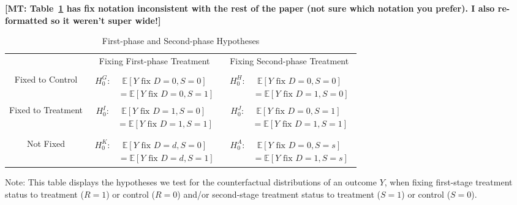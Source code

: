 \textbf{[MT: Table~\ref{table:hypotheses} has fix notation inconsistent with the rest of the paper (not sure which notation you prefer). I also re-formatted so it weren't super wide!]}

\begin{table}[H] 
\begin{threeparttable}
\caption{First-phase and Second-phase Hypotheses}
\label{table:hypotheses}
\centering 
\begin{tabular}{ccc} \toprule
 & Fixing First-phase Treatment & Fixing Second-phase Treatment \\ \\ \midrule
Fixed to Control       & $ \begin{aligned} H_{0}^G: & \enspace \mathbb{E} \left[ Y \text{ fix } D = 0, S = 0 \right]  \\ &= \mathbb{E} \left[ Y \text{ fix } D = 0, S = 1 \right] \end{aligned} $ & $  \begin{aligned} H_{0}^H: & \enspace \mathbb{E} \left[ Y \text{ fix } D = 0, S = 0 \right] \\ & = \mathbb{E} \left[ Y \text{ fix } D = 1, S = 0 \right] \end{aligned} $ \\
Fixed to Treatment  & $ \begin{aligned}  H_{0}^I: & \enspace \mathbb{E} \left[ Y \text{ fix } D = 1, S = 0 \right]  \\  & = \mathbb{E} \left[ Y \text{ fix } D = 1, S = 1 \right] \end{aligned} $ & $ \begin{aligned}  H_{0}^J: & \enspace \mathbb{E} \left[ Y \text{ fix } D = 0, S = 1 \right] \\ & = \mathbb{E} \left[ Y \text{ fix } D = 1, S = 1 \right] \end{aligned} $ \\ \\ \midrule
Not Fixed                 & $ \begin{aligned}  H_{0}^K: & \enspace \mathbb{E} \left[ Y \text{ fix } D = d, S = 0 \right] \\ & = \mathbb{E} \left[ Y \text{ fix } D = d, S = 1 \right] \end{aligned} $ & $ \begin{aligned}  H_{0}^A: & \enspace \mathbb{E} \left[ Y \text{ fix } D = 0, S = s \right] \\ &= \mathbb{E} \left[ Y \text{ fix } D = 1, S = s \right] \end{aligned} $ \\  \toprule
\end{tabular}
\begin{tablenotes}
\footnotesize
\item Note: This table displays the hypotheses we test for the counterfactual distributions of an outcome $Y$, when fixing first-stage treatment status to treatment ($R = 1$) or control ($R = 0$) and/or second-stage treatment status to treatment ($S = 1$) or control ($S = 0$).
\end{tablenotes}
\end{threeparttable}
\end{table}

